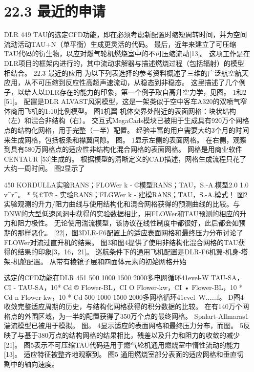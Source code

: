\documentclass[UTF8,11pt,a4paper,openany,fontset=fandol]{ctexbook}
\begin{document}
\section{22.3 最近的申请}
DLR 449 TAU的选定CFD功能，即在必须考虑新配置时缩短周转时间，并为空间流动活动TAU+N（单平衡）生成更灵活的代码。 最后，近年来建立了可压缩TAU代码的衍生物，以应对燃气轮机燃烧室中的不可压缩流动[13]。 这项工作是在DLR项目的框架内进行的，其中流动求解器与描述燃烧过程（包括辐射）的模型相结合。 22.3 最近的应用 为以下列表选择的参考资料概述了三维的广泛航空航天应用，从不可压缩到反应性高超声速流动，从稳态到非稳态。 这里描述了几个例子，以给人以DLR存在的能力的印象，第一个例子取自高升空力学，见图。 1和2 [51]。 配置是DLR ALVAST风洞模型，这是一架类似于空中客车A320的双喷气窄体商用飞机的1:10比例模型。 图1机翼-机体交界处附近的表面网格：块状结构（左）和混合非结构（右）。 交互式MegaCads模块已被用于生成具有920万个网格点的结构化网格，用于完整（一半）配置。 经验丰富的用户需要大约3个月的时间来生成网格，包括板条和襟翼间隙。 图。 1显示左侧的表面网格。 在右侧，观察到具有580万网格点的适应性非结构化混合网格的表面网格。 网格是用商业软件CENTAUR [53]生成的。 根据模型的清晰定义的CAD描述，网格生成流程只花了大约一周时间。 图2显示了

450 KORDULLA实验RANS；FLOWer k - ©模型RANS；TAU，S.-A.模型2.0 1.0 v\textasciicircum{}r\textasciicircum{}。 * \%£T® - 实验RANS；FLGWer k - 建模RANS；TAU，S.-A.模式！ 图2 实验观测的升力/阻力曲线与使用结构化和混合网格获得的预测曲线的比较。与DNW的大型低速风洞中获得的实验数据相比，用FLOWer和TAU预测的相应的升力和阻力极性。 无论使用湍流模型，该协议在线性制度中都很好，此后都会如预期的那样恶化。 [22]，图3DLR-F6配置上的适应表面网格和最终压力分布讨论了FLOWer对流过直升机的结果。 图3和图4提供了使用非结构化混合网格的TAU获得的结果的印象[3，16，21]。 巡航条件下的通用飞机配置是DLR-F6机翼-机身-塔架-机舱配置。 从带有棱镜子层和四面体元素的初始网格开始

选定的CFD功能在DLR 451 500 1000 1500 2000多电网循环41evel-W TAU-SA，CI - TAU-SA，10* Cd ® Flower-BL，CI O Flower-kw，CI • Flower-BL，10 * Cd n Flower-kw，10 * Cd 500 1000 1500 2000多网格循环41evel--W......f。 D图4 收敛完整适应周期的历史，与结构化网格获得的积分数据的比较。 在有140万个网格点的外围区域，为一半的配置获得了350万个点的最终网格。 Spalart-Allmaras1 湍流模型已被用于模拟。 图。 4显示适应的表面网格和最终压力分布，而图。 5反映了与基于380万点的结构网格的结果相比，残差以及升力和阻力的收敛的减少[21]。 图5表示不可压缩TAU代码适用于燃气轮机通用燃烧室中惰性流动的能力[13]。 适应特征被整齐地观察到。 图5 通用燃烧室部分表面的适应网格和垂直切割中的轴向速度。
\end{document}
